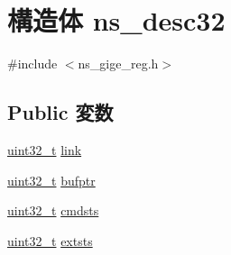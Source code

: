 \hypertarget{structns__desc32}{
\section{構造体 ns\_\-desc32}
\label{structns__desc32}
}


{\ttfamily \#include $<$ns\_\-gige\_\-reg.h$>$}\subsection*{Public 変数}
\begin{DoxyCompactItemize}
\item 
\hyperlink{Type_8hh_a435d1572bf3f880d55459d9805097f62}{uint32\_\-t} \hyperlink{structns__desc32_a6163461798acb053ba062347095330e0}{link}
\item 
\hyperlink{Type_8hh_a435d1572bf3f880d55459d9805097f62}{uint32\_\-t} \hyperlink{structns__desc32_a92de6ac5a104ad75c84325904a146a5f}{bufptr}
\item 
\hyperlink{Type_8hh_a435d1572bf3f880d55459d9805097f62}{uint32\_\-t} \hyperlink{structns__desc32_a7484a3aa644dde4355c24a2c6365715d}{cmdsts}
\item 
\hyperlink{Type_8hh_a435d1572bf3f880d55459d9805097f62}{uint32\_\-t} \hyperlink{structns__desc32_ad874b18768bd13482acfbe2b4825996a}{extsts}
\end{DoxyCompactItemize}


